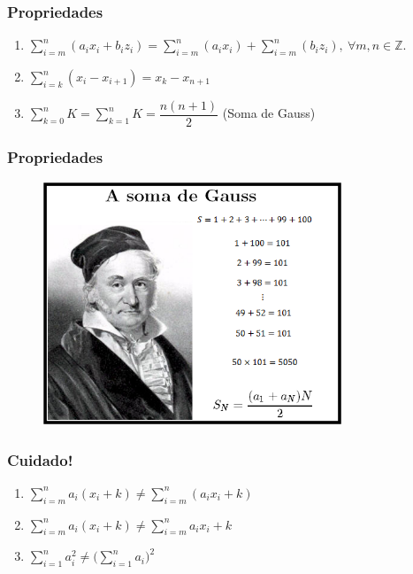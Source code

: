 \documentclass[14pt,aspectratio=1610]{beamer}
\newcounter{saveenumi}
\newcommand{\seti}{\setcounter{saveenumi}{\value{enumi}}}
\newcommand{\conti}{\setcounter{enumi}{\value{saveenumi}}}
\begin{document}
\begin{frame}{}
\frametitle{Propriedades}
\begin{block}{}
\justifying
\begin{enumerate}
    \conti
\item ${\displaystyle \sum_{i=m}^{n}(a_{i}x_{i}+b_{i}z_{i})=\sum_{i=m}^{n}(a_{i}x_{i})+
\sum_{i=m}^{n}(b_{i}z_{i}),\ \forall m,n\in \mathds{Z}.}$ 
\item ${\displaystyle \sum_{i=k}^{n}(x_{i}-x_{i+1})=x_{k}-x_{n+1}}$  
\item ${\displaystyle \sum_{k=0}^{n}K=\sum_{k=1}^{n}K=\dfrac{n(n+1)}{2}}$ (Soma de Gauss) 
    \seti
\end{enumerate}
\end{block}
\end{frame}

\begin{frame}{}
\frametitle{Propriedades}
\begin{block}{}
\justifying
\begin{figure}[H]
    \centering
    \includegraphics[height=0.5\textwidth, width=0.8\textwidth]{Gauss}
  \end{figure}
\end{block}
\end{frame}

\begin{frame}{}
\frametitle{Cuidado!}
\begin{block}{}
\justifying
\begin{enumerate}
\item ${\displaystyle \sum_{i=m}^{n}a_{i}(x_{i}+k)\neq\sum_{i=m}^{n}(a_{i}x_{i}+k)}$\pause
\item ${\displaystyle \sum_{i=m}^{n}a_{i}(x_{i}+k)\neq\sum_{i=m}^{n}a_{i}x_{i}+k}$\pause
\item ${\displaystyle \sum_{i=1}^{n}a_{i}^{2}\neq \Biggl(\sum_{i=1}^{n}a_{i}\Biggl)^{2}}$ 
\end{enumerate}
\end{block}
\end{frame}
\end{document}
